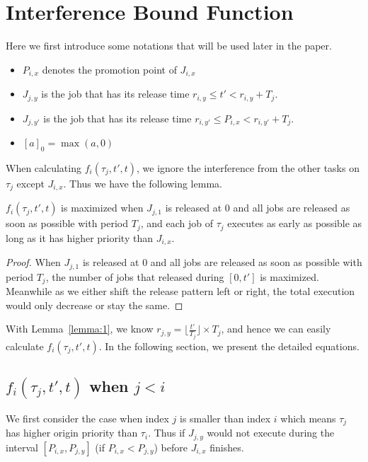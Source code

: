 \section{Interference Bound Function}
Here we first introduce some notations that will be used later in the paper.
\begin{itemize}
	\item $P_{i,x}$ denotes the promotion point of $J_{i,x}$
	\item $J_{j,y}$ is the job that has its release time $r_{i,y}\leq t'<r_{i,y}+T_j$. 
	\item $J_{j,y'}$ is the job that has its release time $r_{i,y'}\leq P_{i,x}<r_{i,y'}+T_j$. 
	\item $[a]_0=\max(a,0)$
\end{itemize}





When calculating $f_i(\tau_j,t',t)$, we ignore the interference from the other tasks on $\tau_j$ except $J_{i,x}$. Thus we have the following lemma.
\begin{lemma}
\label{lemma:1}
$f_i(\tau_j,t',t)$ is maximized when  $J_{j,1}$ is released at $0$ and all jobs are released as soon as possible with period $T_j$, and each job of $\tau_j$ executes as early as possible as long as it has higher priority than $J_{i,x}$.
\end{lemma}
\begin{proof}
When  $J_{j,1}$ is released at $0$ and all jobs are released as soon as possible with period $T_j$, the number of jobs that released during $[0,t']$ is maximized. Meanwhile as we either shift the release pattern left or right,  the total execution would only decrease or stay the same.
\end{proof}




With Lemma~\ref{lemma:1},  we know $r_{j,y}=\lfloor \frac{t'}{T_j}\rfloor\times T_j$, and hence we can easily calculate $f_i(\tau_j,t',t)$. In the following section, we present the detailed equations.
\subsection{$f_i(\tau_j,t',t)$ when $j<i$}
We first consider the case when index $j$ is smaller than index $i$ which means $\tau_j$ has higher origin priority than $\tau_i$. Thus if  $J_{j,y}$ would not  execute  during the interval $[P_{i,x}, P_{j,y}]$ (if $P_{i,x}<P_{j,y}$) before $J_{i,x}$ finishes.

